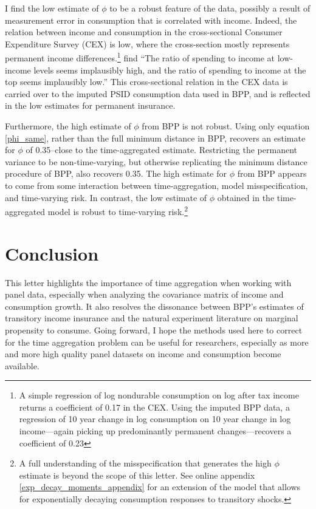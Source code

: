 \documentclass[AER]{AEA}
\begin{document}
I find the low estimate of $\phi$ to be a robust feature of the data, possibly a result of measurement error in consumption that is correlated with income. Indeed, the relation between income and consumption in the cross-sectional Consumer Expenditure Survey (CEX) is low, where the cross-section mostly represents permanent income differences.\footnote{A simple regression of log nondurable consumption on log after tax income returns a coefficient of 0.17 in the CEX. Using the imputed BPP data, a regression of 10 year change in log consumption on 10 year change in log income---again picking up predominantly permanent changes---recovers a coefficient of 0.23} \cite{NBERc12673} find ``The ratio of spending to income at low-income levels seems implausibly high, and the ratio of spending to income at the top seems implausibly low.''  This cross-sectional relation in the CEX data is carried over to the imputed PSID consumption data used in BPP, and is reflected in the low estimates for permanent insurance.

Furthermore, the high estimate of $\phi$ from BPP is not robust. Using only equation \ref{phi_same}, rather than the full minimum distance in BPP, recovers an estimate for $\phi$ of 0.35--close to the time-aggregated estimate. Restricting the permanent variance to be non-time-varying, but otherwise replicating the minimum distance procedure of BPP, also recovers 0.35. The high estimate for $\phi$ from BPP appears to come from some interaction between time-aggregation, model misspecification, and time-varying risk. In contrast, the low estimate of $\phi$ obtained in the time-aggregated model is robust to time-varying risk.\footnote{A full understanding of the misspecification that generates the high $\phi$ estimate is beyond the scope of this letter. See online appendix \ref{exp_decay_moments_appendix} for an extension of the model that allows for exponentially decaying consumption responses to transitory shocks.}


\section{Conclusion}
This letter highlights the importance of time aggregation when working with panel data, especially when analyzing the covariance matrix of income and consumption growth. It also resolves the dissonance between BPP's estimates of transitory income insurance and the natural experiment literature on marginal propensity to consume. Going forward, I hope the methods used here to correct for the time aggregation problem can be useful for researchers, especially as more and more high quality panel datasets on income and consumption become available.
\end{document}
